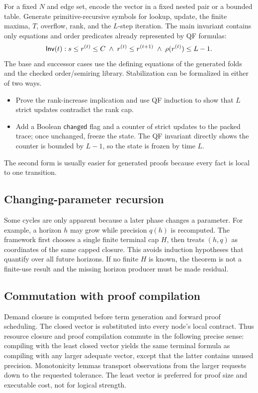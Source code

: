 For a fixed \(N\) and edge set, encode the vector in a fixed nested pair or a bounded table.  Generate primitive-recursive symbols for lookup, update, the finite maxima, \(T\), overflow, rank, and the \(L\)-step iteration.  The main invariant contains only equations and order predicates already represented by QF formulas:
\[
 \mathsf{Inv}(t):
 s\le r^{(t)}\le C\;\wedge\;
 r^{(t)}\le r^{(t+1)}\;\wedge\;
 \rho(r^{(t)})\le L-1.
\]
The base and successor cases use the defining equations of the generated folds and the checked order/semiring library.  Stabilization can be formalized in either of two ways.
\begin{itemize}
  \item Prove the rank-increase implication and use QF induction to show that \(L\) strict updates contradict the rank cap.
  \item Add a Boolean \(\mathsf{changed}\) flag and a counter of strict updates to the packed trace; once unchanged, freeze the state.  The QF invariant directly shows the counter is bounded by \(L-1\), so the state is frozen by time \(L\).
\end{itemize}
The second form is usually easier for generated proofs because every fact is local to one transition.

\subsection{Changing-parameter recursion}

Some cycles are only apparent because a later phase changes a parameter.  For example, a horizon \(h\) may grow while precision \(q(h)\) is recomputed.  The framework first chooses a single finite terminal cap \(H\), then treats \((h,q)\) as coordinates of the same capped closure.  This avoids induction hypotheses that quantify over all future horizons.  If no finite \(H\) is known, the theorem is not a finite-use result and the missing horizon producer must be made residual.

\subsection{Commutation with proof compilation}

Demand closure is computed before term generation and forward proof scheduling.  The closed vector is substituted into every node's local contract.  Thus resource closure and proof compilation commute in the following precise sense: compiling with the least closed vector yields the same terminal formula as compiling with any larger adequate vector, except that the latter contains unused precision.  Monotonicity lemmas transport observations from the larger requests down to the requested tolerance.  The least vector is preferred for proof size and executable cost, not for logical strength.
